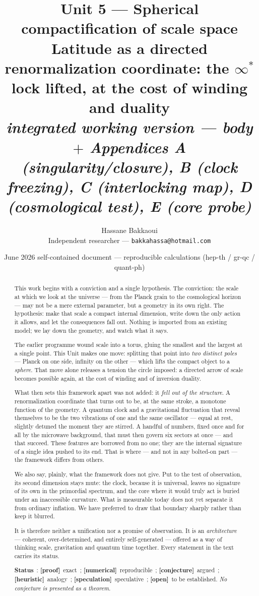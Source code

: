 \documentclass[11pt]{article}
\title{\textbf{Unit 5 --- Spherical compactification of scale space}\\[2mm]
\large Latitude as a directed renormalization coordinate: the $\infty^\ast$ lock lifted,
at the cost of winding and duality\\[1mm]
\normalsize\textit{integrated working version --- body $+$ Appendices A (singularity/closure),
B (clock freezing), C (interlocking map), D (cosmological test), E (core probe)}}
\author{Hassane Bakkaoui\\\small Independent researcher --- \texttt{bakkahassa@hotmail.com}}
\date{\small June 2026 \;\textbullet\; self-contained document --- reproducible calculations (hep-th / gr-qc / quant-ph)}
\newcommand{\preuve}{{\small\textbf{[proof]}}}
\newcommand{\num}{{\small\textbf{[numerical]}}}
\newcommand{\conj}{{\small\textbf{[conjecture]}}}
\newcommand{\heur}{{\small\textbf{[heuristic]}}}
\newcommand{\spec}{{\small\textbf{[speculation]}}}
\newcommand{\ouv}{{\small\textbf{[open]}}}
\theoremstyle{definition}
\begin{document}
\maketitle

\begin{abstract}
\noindent This work begins with a conviction and a single hypothesis. The conviction: the scale at
which we look at the universe --- from the Planck grain to the cosmological horizon --- may not be a mere
external parameter, but a geometry in its own right. The hypothesis: make that scale a compact internal
dimension, write down the only action it allows, and let the consequences fall out. Nothing is imported
from an existing model; we lay down the geometry, and watch what it says.

\smallskip
\noindent The earlier programme wound scale into a torus, gluing the smallest and the largest at a single
point. This Unit makes one move: splitting that point into \emph{two distinct poles} --- Planck on one
side, infinity on the other --- which lifts the compact object to a \emph{sphere}. That move alone releases
a tension the circle imposed: a directed arrow of scale becomes possible again, at the cost of winding and
of inversion duality.

\smallskip
\noindent What then sets this framework apart was not added: it \emph{fell out of the structure}. A
renormalization coordinate that turns out to be, at the same stroke, a monotone function of the geometry.
A quantum clock and a gravitational fluctuation that reveal themselves to be the two vibrations of one and
the same oscillator --- equal at rest, slightly detuned the moment they are stirred. A handful of numbers,
fixed once and for all by the microwave background, that must then govern six sectors at once --- and that
succeed. These features are borrowed from no one; they are the internal signature of a single idea pushed
to its end. That is where --- and not in any bolted-on part --- the framework differs from others.

\smallskip
\noindent We also say, plainly, what the framework does not give. Put to the test of observation, its
second dimension stays mute: the clock, because it is universal, leaves no signature of its own in the
primordial spectrum, and the core where it would truly act is buried under an inaccessible curvature. What
is measurable today does not yet separate it from ordinary inflation. We have preferred to draw that
boundary sharply rather than keep it blurred.

\smallskip
\noindent It is therefore neither a unification nor a promise of observation. It is an \emph{architecture}
--- coherent, over-determined, and entirely self-generated --- offered as a way of thinking scale,
gravitation and quantum time together. Every statement in the text carries its status.

\smallskip
\noindent\textbf{Status}~: \preuve\ exact~; \num\ reproducible~; \conj\ argued~;
\heur\ analogy~; \spec\ speculative~; \ouv\ to be established. \emph{No conjecture is presented
as a theorem.}
\end{abstract}
\end{document}
